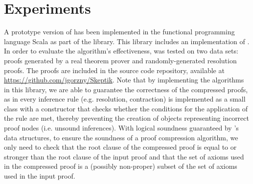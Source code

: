 \section{Experiments} \label{sec:exp}

A prototype version of {\FORPI} has been implemented in the functional programming language Scala as part of the \skeptik
library. This library includes an implementation of {\GFOLU} \cite{GFOLU}. In order to evaluate the algorithm's effectiveness, {\FORPI} was tested on two data sets: proofs generated by a real theorem prover and randomly-generated resolution proofs. The proofs are included in the source code repository, available at \url{https://github.com/jgorzny/Skeptik}. Note that by implementing the algorithms in this library, we are able to guarantee the correctness of the compressed proofs, as in \skeptik every inference rule (e.g. resolution, contraction) is implemented as a small class with a constructor that checks whether the conditions for the application of the rule are met, thereby preventing the creation of objects representing incorrect proof nodes (i.e. unsound inferences). With logical soundness guaranteed by \skeptik's data structures, to ensure the soundness of a proof compression algorithm, we only need to check that the root clause of the compressed proof is equal to or stronger than the root clause of the input proof and that the set of axioms used in the compressed proof is a (possibly non-proper) subset of the set of axioms used in the input proof.


